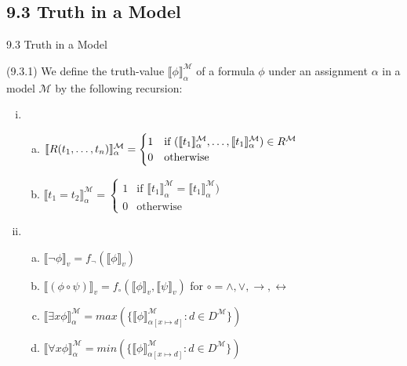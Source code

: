 \subsection{9.3 Truth in a Model}

\begin{frame}{9.3 Truth in a Model}

(9.3.1) We define the truth-value $\llbracket\phi\rrbracket^\mathcal{M}_\alpha$ of a formula $\phi$ under an assignment $\alpha$ in a model $\mathcal{M}$ by the following recursion:
		
		\begin{enumerate}[(i)]
			
				\item		\begin{enumerate}[(a)]

					\item $\llbracket R(t_1,\mathellipsis, t_n)\rrbracket_\alpha^\mathcal{M}=\begin{cases} 1 & \text{if }(\llbracket t_1\rrbracket^\mathcal{M}_\alpha,\mathellipsis, \llbracket t_1\rrbracket^\mathcal{M}_\alpha)\in R^\mathcal{M}\\0 &\text{otherwise}\end{cases}$
					\item $\llbracket t_1=t_2\rrbracket_\alpha^\mathcal{M}=\begin{cases} 1 & \text{if }\llbracket t_1\rrbracket^\mathcal{M}_\alpha=\llbracket t_1\rrbracket^\mathcal{M}_\alpha)\\0 &\text{otherwise}\end{cases}$				
				\end{enumerate}
				
				\item \begin{enumerate}[(a)]

					\item  $\llbracket\neg \phi\rrbracket_v=f_\neg(\llbracket\phi\rrbracket_v)$
				
				\item  $\llbracket(\phi\circ \psi)\rrbracket_v=f_\circ( \llbracket\phi\rrbracket_v, \llbracket\psi\rrbracket_v)$ for $\circ=\land,\lor,\to,\leftrightarrow$
				
				\item $\llbracket\exists x\phi\rrbracket_\alpha^\mathcal{M}=max(\{\llbracket \phi\rrbracket^\mathcal{M}_{\alpha[x\mapsto d]}: d\in D^\mathcal{M}\})$
				
				\item[] $\llbracket\forall x\phi\rrbracket_\alpha^\mathcal{M}=min(\{\llbracket \phi\rrbracket^\mathcal{M}_{\alpha[x\mapsto d]}: d\in D^\mathcal{M}\})$
								
				\end{enumerate}
			
			\end{enumerate}

\end{frame}

